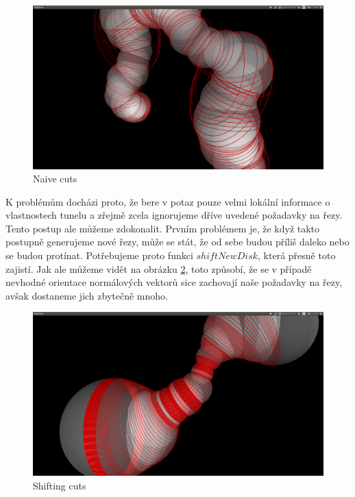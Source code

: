 \begin{figure}[ht]
    \centering
    \includegraphics[width=\textwidth]{img/naive_cuts.png}
    \caption{Naive cuts}
  \centering
  \label{fig:naive_cuts}
\end{figure}

K problémům docházi proto, že bere v potaz pouze velmi lokální informace o vlastnostech
tunelu a zřejmě zcela ignorujeme dříve uvedené požadavky na řezy. Tento postup ale
můžeme zdokonalit. Prvním problémem je, že když takto postupně generujeme nové řezy,
může se stát, že od sebe budou příliš daleko nebo se budou protínat. Potřebujeme proto
funkci $ shiftNewDisk $, která přesně toto zajistí. Jak ale můžeme vidět na obrázku
\ref{fig:shift_cuts}, toto způsobí, že se v případě nevhodné orientace normálových
vektorů sice zachovají naše požadavky na řezy, avšak dostaneme jich zbytečně mnoho.

\begin{figure}[ht]
    \centering
    \includegraphics[width=\textwidth]{img/shift_cuts.png}
    \caption{Shifting cuts}
  \centering
  \label{fig:shift_cuts}
\end{figure}

